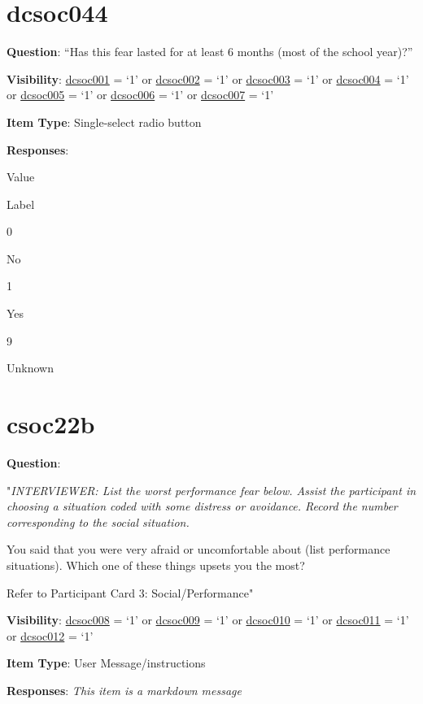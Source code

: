 \documentclass[]{book}
\begin{document}
\hypertarget{dcsoc044}{%
\section{dcsoc044}\label{dcsoc044}}

\textbf{Question}: ``Has this fear lasted for at least 6 months (most of the school year)?''

\textbf{Visibility}: \protect\hyperlink{dcsoc001}{dcsoc001} = `1' or \protect\hyperlink{dcsoc002}{dcsoc002} = `1' or \protect\hyperlink{dcsoc003}{dcsoc003} = `1' or \protect\hyperlink{dcsoc004}{dcsoc004} = `1' or \protect\hyperlink{dcsoc005}{dcsoc005} = `1' or \protect\hyperlink{dcsoc006}{dcsoc006} = `1' or \protect\hyperlink{dcsoc007}{dcsoc007} = `1'

\textbf{Item Type}: Single-select radio button

\textbf{Responses}:

Value

Label

0

No

1

Yes

9

Unknown

\hypertarget{csoc22b}{%
\section{csoc22b}\label{csoc22b}}

\textbf{Question}:

"\emph{INTERVIEWER: List the worst performance fear below. Assist the participant in choosing a situation coded with some distress or avoidance. Record the number corresponding to the social situation.}

You said that you were very afraid or uncomfortable about (list performance situations). Which one of these things upsets you the most?

Refer to Participant Card 3: Social/Performance"

\textbf{Visibility}: \protect\hyperlink{dcsoc008}{dcsoc008} = `1' or \protect\hyperlink{dcsoc009}{dcsoc009} = `1' or \protect\hyperlink{dcsoc010}{dcsoc010} = `1' or \protect\hyperlink{dcsoc011}{dcsoc011} = `1' or \protect\hyperlink{dcsoc012}{dcsoc012} = `1'

\textbf{Item Type}: User Message/instructions

\textbf{Responses}: \emph{This item is a markdown message}
\end{document}
